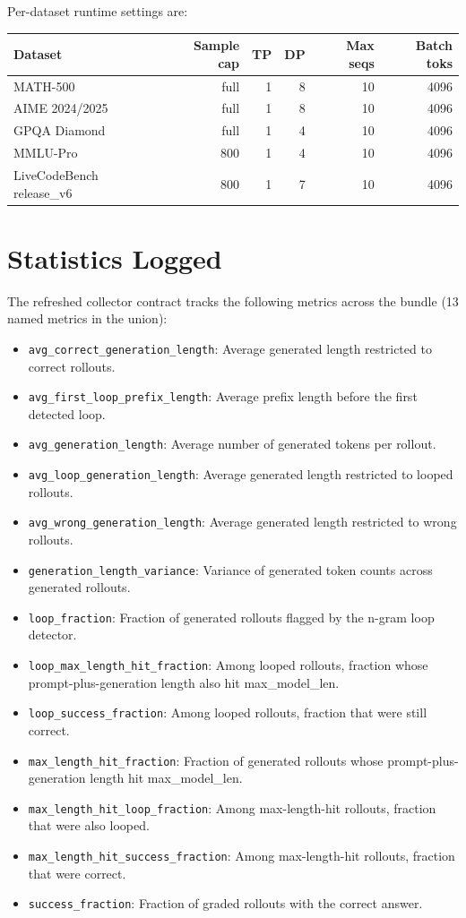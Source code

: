 \documentclass[11pt]{article}
\begin{document}
Per-dataset runtime settings are:
\begin{tabular}{lrrrrr}
\toprule
Dataset & Sample cap & TP & DP & Max seqs & Batch toks \\
\midrule
MATH-500 & full & 1 & 8 & 10 & 4096 \\
AIME 2024/2025 & full & 1 & 8 & 10 & 4096 \\
GPQA Diamond & full & 1 & 4 & 10 & 4096 \\
MMLU-Pro & 800 & 1 & 4 & 10 & 4096 \\
LiveCodeBench release\_v6 & 800 & 1 & 7 & 10 & 4096 \\
\bottomrule
\end{tabular}

\section*{Statistics Logged}
The refreshed collector contract tracks the following metrics across the bundle (13 named metrics in the union):
\begin{itemize}[leftmargin=1.5em]
\item \texttt{avg\_correct\_generation\_length}: Average generated length restricted to correct rollouts.
\item \texttt{avg\_first\_loop\_prefix\_length}: Average prefix length before the first detected loop.
\item \texttt{avg\_generation\_length}: Average number of generated tokens per rollout.
\item \texttt{avg\_loop\_generation\_length}: Average generated length restricted to looped rollouts.
\item \texttt{avg\_wrong\_generation\_length}: Average generated length restricted to wrong rollouts.
\item \texttt{generation\_length\_variance}: Variance of generated token counts across generated rollouts.
\item \texttt{loop\_fraction}: Fraction of generated rollouts flagged by the n-gram loop detector.
\item \texttt{loop\_max\_length\_hit\_fraction}: Among looped rollouts, fraction whose prompt-plus-generation length also hit max\_model\_len.
\item \texttt{loop\_success\_fraction}: Among looped rollouts, fraction that were still correct.
\item \texttt{max\_length\_hit\_fraction}: Fraction of generated rollouts whose prompt-plus-generation length hit max\_model\_len.
\item \texttt{max\_length\_hit\_loop\_fraction}: Among max-length-hit rollouts, fraction that were also looped.
\item \texttt{max\_length\_hit\_success\_fraction}: Among max-length-hit rollouts, fraction that were correct.
\item \texttt{success\_fraction}: Fraction of graded rollouts with the correct answer.
\end{itemize}
\end{document}
